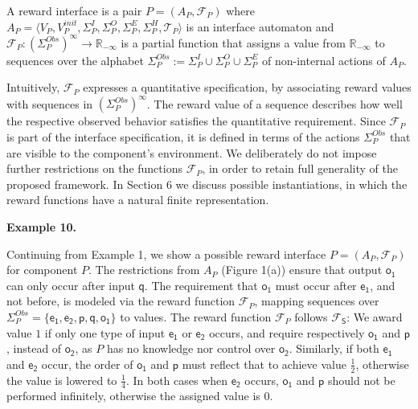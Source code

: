 \documentclass[10pt,a4paper]{article}
\begin{document}
 
A reward interface is a pair $P=(A_{P},\mathcal{F}_{P})$ where $A_{P}=\langle V_{P},V_{P}^{init},\Sigma_{P}^{I},\Sigma_{P}^{O},\Sigma_{P}^{E},\Sigma_{P}^{H},\mathcal{T}_{P}\rangle$ is an interface automaton and $\mathcal{F}_{P}:(\Sigma^{Obs}_{P})^{\infty}\to\mathbb{R}_{-\infty}$ is a partial function that assigns a value from $\mathbb{R}_{-\infty}$ to sequences over the alphabet $\Sigma^{Obs}_{P}:=\Sigma^{I}_{P}\cup\Sigma^{O}_{P}\cup\Sigma^{E}_{P}$ of non-internal actions of $A_{P}$.\par
 
 
 
 
Intuitively, $\mathcal{F}_{P}$ expresses a quantitative specification, by associating reward values with sequences in $(\Sigma^{Obs}_{P})^{\infty}$. The reward value of a sequence describes how well the respective observed behavior satisfies the quantitative requirement. Since $\mathcal{F}_{P}$ is part of the interface specification, it is defined in terms of the actions $\Sigma^{Obs}_{P}$ that are visible to the component’s environment. We deliberately do not impose further restrictions on the functions $\mathcal{F}_{P}$, in order to retain full generality of the proposed framework. In Section 6 we discuss possible instantiations, in which the reward functions have a natural finite representation.\par
 
 
 
\par\medskip\noindent\textbf{Example 10.}\par
 
 
Continuing from Example 1, we show a possible reward interface $P=(A_{P},\mathcal{F}_{P})$ for component $P$. The restrictions from $A_{P}$ (Figure 1(a)) ensure that output $\mathsf{o_{1}}$ can only occur after input $\mathsf{q}$. The requirement that $\mathsf{o_{1}}$ must occur after $\mathsf{e_{1}}$, and not before, is modeled via the reward function $\mathcal{F}_{P}$, mapping sequences over $\Sigma_{P}^{Obs}=\{\mathsf{e_{1}},\mathsf{e_{2}},\mathsf{p},\mathsf{q},\mathsf{o_{1}}\}$ to values. The reward function $\mathcal{F}_{P}$ follows $\mathcal{F}_{\mathsf{S}}$: We award value $1$ if only one type of input $\mathsf{e_{1}}$ or $\mathsf{e_{2}}$ occurs, and require respectively $\mathsf{o_{1}}$ and $\mathsf{p}$, instead of $\mathsf{o_{2}}$, as $P$ has no knowledge nor control over $\mathsf{o_{2}}$. Similarly, if both $\mathsf{e_{1}}$ and $\mathsf{e_{2}}$ occur, the order of $\mathsf{o_{1}}$ and $\mathsf{p}$ must reflect that to achieve value $\frac{1}{2}$, otherwise the value is lowered to $\frac{1}{4}$. In both cases when $\mathsf{e_{2}}$ occurs, $\mathsf{o_{1}}$ and $\mathsf{p}$ should not be performed infinitely, otherwise the assigned value is $0$.\par
 
\end{document}
